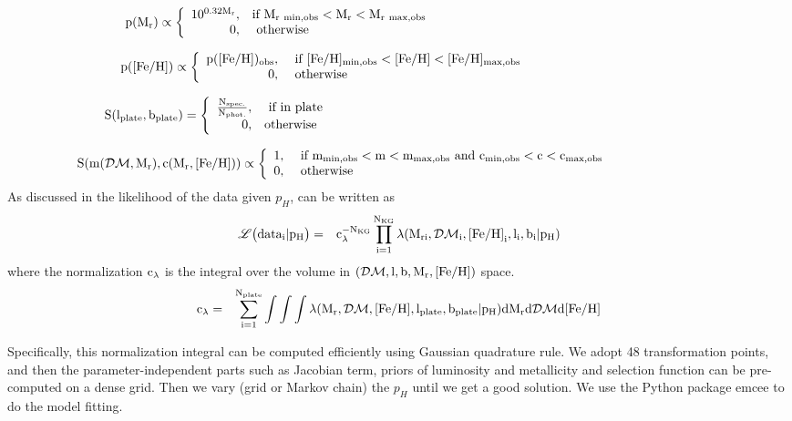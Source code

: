 \documentclass[12pt,preprint]{aastex}
\newcommand{\DM}{\mathcal{DM}}
\newcommand{\feh}{{\rm [Fe/H]}}
\newcommand{\lph}{\mathscr{L}\bigl({data_i}|p_H\bigr)}
\begin{document}
$$
\rm p(M_r) \propto \left\{ \begin{array}{rl}
 \rm 10^{0.32M_r}, &\mbox{\rm if $\rm M_{r~min,obs}<M_r<M_{r~max,obs}$} ~~~~~~~~~~~~~~~~~~~~~~~~~~~~~~~~~~~~~~~~~~~~~~~~~~~~~~~\\
  0, &\mbox{ \rm otherwise}~~~~~~~~~~~~~~~~~~~~~~~~~~~~~~~~~~~~~~~~~~~~~~~~~~~~~~~~~~~~~~~~~~~~~~~~~~~~~~~~~~~~
       \end{array} \right.
$$

$$
\rm p(\feh) \propto \left\{ \begin{array}{rl}\rm p(\feh)_{obs}, &\mbox{ \rm if $\rm [Fe/H]_{min,obs}<\feh<[Fe/H]_{max,obs}$} ~~~~~~~~~~~~~~~~~~~~~~~~~~~~~~~~~~~\\
  0, &\mbox{ \rm otherwise}~~~~~~~~~~~~~~~~~~~~~~~~~~~~~~~~
       \end{array} \right.
$$

$$
\rm S(l_{plate},b_{plate})=\left\{ \begin{array}{rl}
 \rm \frac{\rm N_{spec.}}{\rm N_{phot.}}, &\mbox{ \rm if in plate} ~~~~~~~~~~~~~~~~~~~~~~~~~~~~~~~~~~~~~~~~~~~~~~~~~~~~~~~~~~~~~~~~~~~~~~~~~~~~~\\
  0, &\mbox{\rm otherwise}~~~~~~~~~~~~~~~~~~~~~~~~~~~~~~~~~~~~~~~~~~~~~~~~~~~~~~~~~~~~~~~~~~~~~~~~~~~~~~~~~~~~~~~
       \end{array} \right.
$$

$$
\rm S(m(\DM,M_r),c(M_r,\feh))\propto \left\{ \begin{array}{rl}
 1, &\mbox{ \rm if $\rm m_{min,obs}<m<m_{max,obs}$ and $\rm c_{min,obs}<c<c_{max,obs}$} ~~~~~~~~~~~~~~~~~~~~~~~~~~ \\
  0, &\mbox{ otherwise}~~~~~~~~~~~~~~~~~~~~~~~~~~~~~~~~~~~~~~~~~~~~~~~~~~~~~
       \end{array} \right.
$$
As discussed in \citet{Bovy2012} the likelihood of the data given $p_H$, can be written as
\begin{eqnarray}
\rm \lph &=& \rm c_{\lambda}^{-N_{KG}}\prod \limits_{i=1}^{N_{KG}}\lambda(M_{ri},\DM_i,\feh_i,l_i,b_i|p_H)
\end{eqnarray}
where the normalization $\rm c_\lambda$ is the integral over the volume in $\rm (\DM,l,b,M_r,\feh)$ space. 
\begin{eqnarray}
\rm c_\lambda&=&\rm \sum \limits_{i=1}^{N_{plate}} \int\int\int \lambda(M_r,\DM,\feh,l_{plate},b_{plate}|p_H)dM_rd \DM d \feh
\end{eqnarray}

Specifically, this normalization integral can be computed efficiently using Gaussian quadrature rule. We adopt 48 transformation points, and then the parameter-independent parts such as Jacobian term, priors of luminosity and metallicity and selection function can be pre-computed on a dense grid. Then we vary (grid or Markov chain) the $p_H$ until we get a good solution. We use the Python package emcee\citep{Foreman2013} to do the model fitting.
\end{document}
